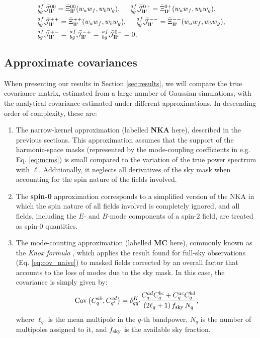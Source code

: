 \documentclass[a4paper,11pt]{article}
\begin{document}
        \begin{align}\label{eq:coeff_cmcm_flat}
          &\,^{af}_{bg}\bar{\mathcal{J}}^{00}_{{\bf l}{\bf l}'}=\bar{\Xi}^{00}_{{\bf l}{\bf l}'}(w_aw_f,w_bw_g),\hspace{12pt}
           \,^{af}_{bg}\bar{\mathcal{J}}^{0+}_{{\bf l}{\bf l}'}=\bar{\Xi}^{0+}_{{\bf l}{\bf l}'}(w_aw_f,w_bw_g),\\
          &\,^{af}_{bg}\bar{\mathcal{J}}^{++}_{{\bf l}{\bf l}'}=\bar{\Xi}^{++}_{{\bf l}{\bf l}'}(w_aw_f,w_bw_g),\hspace{12pt}
           \,^{af}_{bg}\bar{\mathcal{J}}^{--}_{{\bf l}{\bf l}'}=\bar{\Xi}^{--}_{{\bf l}{\bf l}'}(w_aw_f,w_bw_g),\\
          &\,^{af}_{bg}\bar{\mathcal{J}}^{+-}_{{\bf l}{\bf l}'}=
           \,^{af}_{bg}\bar{\mathcal{J}}^{-+}_{{\bf l}{\bf l}'}=
           \,^{af}_{bg}\bar{\mathcal{J}}^{0-}_{{\bf l}{\bf l}'}=0,
        \end{align}
        
    \subsection{Approximate covariances}\label{ssec:theory.approx}
      When presenting our results in Section \ref{sec:results}, we will compare the true covariance matrix, estimated from a large number of Gaussian simulations, with the analytical covariance estimated under different approximations. In descending order of complexity, these are:
      \begin{enumerate}
        \item The narrow-kernel approximation (labelled {\bf NKA} here), described in the previous sections. This approximation assumes that the support of the harmonic-space masks (represented by the mode-coupling coefficients in e.g. Eq. \ref{eq:mcms}) is small compared to the variation of the true power spectrum with $\ell$. Additionally, it neglects all derivatives of the sky mask when accounting for the spin nature of the fields involved.
        \item The {\bf spin-0} approximation corresponds to a simplified version of the NKA in which the spin nature of all fields involved is completely ignored, and all fields, including the $E$- and $B$-mode components of a spin-2 field, are treated as spin-0 quantities.
        \item The mode-counting approximation (labelled {\bf MC} here), commonly known as the {\sl Knox formula} \cite{1995PhRvD..52.4307K}, which applies the result found for full-sky observations (Eq. \ref{eq:cov_naive}) to masked fields corrected by an overall factor that accounts to the loss of modes due to the sky mask. In this case, the covariance is simply given by:
        \begin{equation}\label{eq:cov_naive_bpw}
          {\rm Cov}\left(C^{ab}_q,C^{cd}_{q'}\right)=\delta^K_{qq'}\frac{C^{ad}_qC^{bc}_q+C^{ac}_qC^{bd}_q}{(2\ell_q+1)\,f_{\rm sky}\,N_q},
        \end{equation}
        where $\ell_q$ is the mean multipole in the $q$-th bandpower, $N_q$ is the number of multipoles assigned to it, and $f_{\rm sky}$ is the available sky fraction.
      \end{enumerate}
\end{document}
